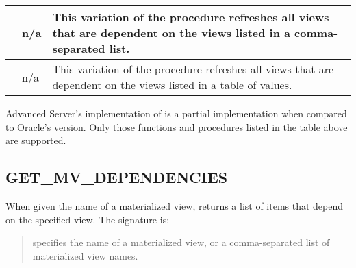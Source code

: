 \documentclass[letterpaper,10pt,english,openany,oneside]{sphinxmanual}
\begin{document}
\begin{savenotes}
\begin{tabulary}{\linewidth}[t]{|T|T|T|}
&
n/a
&
This variation of the  procedure refreshes all views that are dependent on the views listed in a comma-separated list.
\\
\hline
{}
&
n/a
&
This variation of the  procedure refreshes all views that are dependent on the views listed in a table of  values.
\\
\hline
\end{tabulary}
\par
\sphinxattableend\end{savenotes}

Advanced Server’s implementation of  is a partial
implementation when compared to Oracle’s version. Only those functions
and procedures listed in the table above are supported.

\newpage


\subsection{GET\_MV\_DEPENDENCIES}
\label{\detokenize{get_mv_dependencies::doc}}\label{\detokenize{get_mv_dependencies:get-mv-dependencies}}
When given the name of a materialized view, 
returns a list of items that depend on the specified view. The signature
is:
\begin{quote}

\begin{quote}


\end{quote}
\end{quote}


\begin{quote}

 specifies the name of a materialized view, or a
comma-separated list of materialized view names.
\end{quote}
\end{document}
